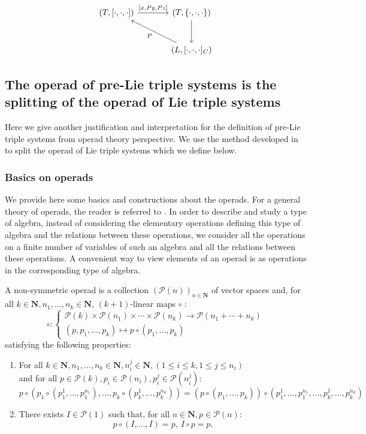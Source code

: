 \documentclass[11pt, twoside]{article}
\begin{document}
\[\begin{tikzcd}[row sep=large, column sep=large]
	{(T,[\cdot,\cdot,\cdot])} & {(T,\left\{\cdot,\cdot,\cdot \right\})} \\
	& {(L,[\cdot,\cdot,\cdot]_C)}
	\arrow["{[x,Py,Pz]}", from=1-1, to=1-2]
	\arrow[from=1-2, to=2-2]
	\arrow["P", from=2-2, to=1-1]
\end{tikzcd}\]

\subsection{The operad of pre-Lie triple systems is the splitting of the operad of Lie triple systems}\label{sub4}

Here we give another justification and interpretation for the definition of pre-Lie triple systems from operad theory perspective. We use the method developed in \cite{PBG13} to split the operad of Lie triple systems which we define below. 

\subsubsection{Basics on operads}

We provide  here some basics and constructions about the operads. For a general theory of operads, the reader is referred  to \cite{LV12}. In order to describe and study a type of algebra, instead of considering the elementary operations defining this type of algebra and the relations between these operations, we consider all the operations on a finite number of variables of such an algebra and all the relations between these operations. A convenient way to view elements of an operad is as operations in the corresponding type of algebra. 

    A non-symmetric operad is a collection $(\mathcal{P}(n))_{n\in \mathbf{N}} $ of vector spaces and, for all $k\in \mathbf{N}, n_1,\ldots,n_k\in \mathbf{N} $,   $(k+1) $-linear maps $\circ$ : $$\circ: \left\{\begin{matrix}
\mathcal{P}(k)\times \mathcal{P} (n_1)\times \cdots \times \mathcal{P}(n_k)\longrightarrow \mathcal{P}(n_1+\cdots+ n_k) \\ (p,p_1,\ldots,p_k)\longmapsto p\circ (p_1,\ldots,p_k)
\end{matrix}\right. $$ satisfying the following properties: \begin{enumerate}
    \item For all $k\in \mathbf{N},n_1,\ldots,n_k\in \mathbf{N},n_i^j\in \mathbf{N},(1\leq i\leq k,1\leq j\leq n_i) $ \\ and for all $p\in \mathcal{P}(k),p_i\in \mathcal{P}(n_i), p_i^j\in \mathcal{P}(n_i^j):  $ $$p\circ (p_1\circ (p_1^1,\ldots,p_1^{n_1}),\ldots,p_k\circ(p_k^1,\ldots,p_k^{n_k}))=(p\circ (p_1,\ldots,p_k))\circ (p_1^1,\ldots,p_1^{n_1},\ldots,p_k^1,\ldots,p_k^{n_k}) $$
    \item There exists $I\in \mathcal{P}(1) $ such that, for all $n\in \mathbf{N}, p\in \mathcal{P}(n)$: $$p\circ (I,\ldots,I)=p, \ I\circ p=p. $$
\end{enumerate}
\end{document}
